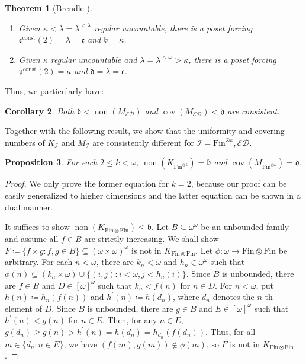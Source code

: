\documentclass[a4paper,12pt]{amsart}
\newtheorem{thm}{Theorem}
\newtheorem{prop}[thm]{Proposition}
\newtheorem{cor}[thm]{Corollary}
\theoremstyle{definition}
\numberwithin{thm}{section}
\numberwithin{equation}{section}
\newcommand{\oo}{{\omega}^\omega}
\newcommand{\ooo}{[{\omega}]^\omega}
\newcommand{\bb}{\mathfrak{b}}
\newcommand{\dd}{\mathfrak{d}}
\newcommand{\ee}{\mathfrak{e}}
\DeclareMathOperator{\non}{non}
\DeclareMathOperator{\cov}{cov}
\newcommand{\ed}{\mathcal{ED}}
\newcommand{\I}{\mathscr{I}}
\newcommand{\finfin}{\mathrm{Fin}\otimes\mathrm{Fin}}
\newcommand{\rb}[1]{(#1)}    %
\newcommand{\continuum}{\mathfrak{c}}
\newcommand{\eect}{\ee^{\mathrm{const}}(2)}
\newcommand{\vv}{\mathfrak{v}}
\newcommand{\vvct}{\vv^{\mathrm{const}}(2)}
\begin{document}
    \begin{thm}[Brendle \cite{Bre03}]\label{thm:const_evasion_b}\leavevmode
        \begin{enumerate}
            \item Given $\kappa<\lambda=\lambda^{<\lambda}$ regular uncountable, there is a poset forcing $\eect=\lambda=\continuum$ and $\bb=\kappa$.
            \item Given $\kappa$ regular uncountable and $\lambda=\lambda^{<\omega}>\kappa$, there is a poset forcing $\vvct=\kappa$ and $\dd=\lambda=\continuum$.
        \end{enumerate}
    \end{thm}
    
    Thus, we particularly have:
    
    \begin{cor}
    	Both $\bb<\non(M_{\ed})$ and $\cov(M_{\ed})<\dd$ are  consistent.
    \end{cor}

    Together with the following result, we show that the uniformity and covering numbers of $K_\I$ and $M_\I$ are consistently different for $\I = \mathrm{Fin}^{\otimes k}, \ed$.

    \begin{prop}\label{prop:K_finfin_b}
        For each $2\leq k<\omega$, $\non(K_{\mathrm{Fin}^{\otimes k}}) = \bb$ and $\cov(M_{\mathrm{Fin}^{\otimes k}}) = \dd$.
    \end{prop}
    \begin{proof}
        We only prove the former equation for $k = 2$, because our proof can be easily generalized to higher dimensions and the latter equation can be shown in a dual manner.
        
        It suffices to show $\non(K_{\finfin})\leq\bb$. Let $B\subseteq\oo$ be an unbounded family and assume all $f\in B$ are strictly increasing. We shall show $F\coloneqq\{f\times g:f,g\in B\}\subseteq\left(\omega\times\omega\right)^\omega$ is not in $K_{\finfin}$. Let $\phi\colon\omega\to\finfin$ be arbitrary. For each $n<\omega$, there are $k_n<\omega$ and $h_n\in\oo$ such that $\phi(n)\subseteq \rb{k_n\times\omega }\cup \{(i,j):i<\omega, j<h_n(i)\}$. Since $B$ is unbounded, there are $f\in B$ and $D\in\ooo$ such that $k_n<f(n)$ for $n\in D$. For $n<\omega$, put $h(n)\coloneqq h_n(f(n))$ and $h^\prime(n)\coloneqq h(d_n)$, where $d_n$ denotes the $n$-th element of $D$. Since $B$ is unbounded, there are $g\in B$ and $E\in\ooo$ such that $h^\prime(n)<g(n)$ for $n\in E$. Then, for any $n\in E$, $g(d_n)\geq g(n)>h^\prime(n)=h(d_n)=h_{d_n}(f(d_n))$. Thus, for all $m\in\{d_n:n\in E\}$, we have $(f(m),g(m))\notin \phi(m)$, so $F$ is not in $K_{\finfin}$.
    \end{proof}
\end{document}
